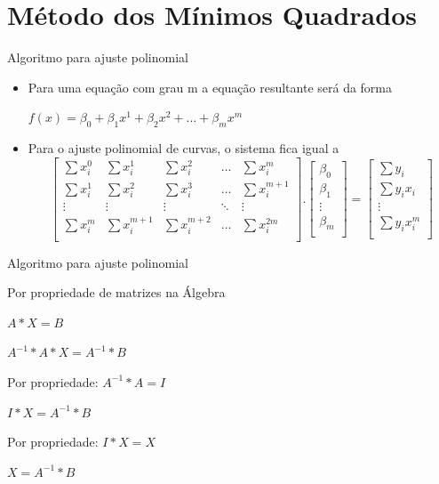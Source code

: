 \documentclass[10pt]{beamer}
\begin{document}
\section{Método dos Mínimos Quadrados}
\begin{frame}[fragile]{Algoritmo para ajuste polinomial}
  \begin{itemize}
  \item Para uma equação com grau m a equação resultante será da forma  \begin{center}$f(x) = \beta_0 + \beta_1x^{1} + \beta_2x^{2} + \dots + \beta_mx^{m}$\newline\end{center}
  
  \item Para o ajuste polinomial de curvas, o sistema fica
igual a   
  \newline
  \[
    \begin{bmatrix}
      \sum{x_{i}^{0}} & \sum{x_{i}^{1}} & \sum{x_{i}^{2}} & \dots  & \sum{x_{i}^{m}} \\
      \sum{x_{i}^{1}} & \sum{x_{i}^{2}} & \sum{x_{i}^{3}} & \dots & \sum{x_{i}^{m+1}}\\
      \vdots & \vdots & \vdots & \ddots & \vdots \\
      \sum{x_{i}^{m}} & \sum{x_{i}^{m+1}} & \sum{x_{i}^{m+2}} & \dots  & \sum{x_{i}^{2m}} \\
    \end{bmatrix}
    .
    \begin{bmatrix}
      \beta_0 \\
      \beta_1 \\
      \vdots  \\
      \beta_m \\
    \end{bmatrix}
    =
    \begin{bmatrix}
      \sum{y_{i}} \\
      \sum{y_{i}x_{i}}\\
      \vdots \\
      \sum{y_{i}x_{i}^{m}} \\
    \end{bmatrix}
  \]
  \newline
  \end{itemize}
\end{frame}


\begin{frame}[fragile]{Algoritmo para ajuste polinomial}
  
  Por propriedade de matrizes na Álgebra 

  {\centering
    $A * X = B$\par
    $A^{-1} * A * X = A^{-1} * B$\par
    Por propriedade: $A^{-1} * A = I$\par
    $I * X = A^{-1} * B$\par
    Por propriedade: $I * X = X$\par
    $X = A^{-1} * B$\par
  }

\end{frame}
\end{document}
